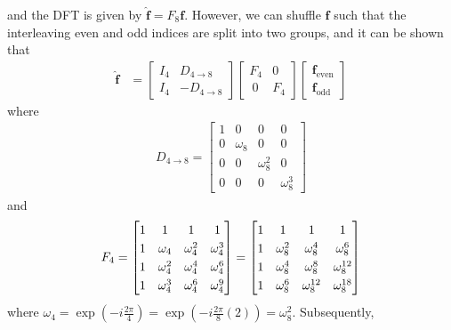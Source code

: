 and the DFT is given by $\hat{\textbf{f}} = F_8 \textbf{f}$. However, we can shuffle $\textbf{f}$ such that the interleaving even and odd indices are split into two groups, and it can be shown that
\begin{align*}
\hat{\textbf{f}} &= 
\begin{bmatrix}
I_4 & D_{4 \to 8} \\
I_4 & -D_{4 \to 8}
\end{bmatrix}
\begin{bmatrix}
F_4 & 0 \\\
0 & F_4
\end{bmatrix}
\begin{bmatrix}
\textbf{f}_{\text{even}} \\
\textbf{f}_{\text{odd}}
\end{bmatrix}
\end{align*}
where
\begin{align*}
D_{4 \to 8} = 
\begin{bmatrix}
1 & 0 & 0 & 0 \\
0 & \omega_8 & 0 & 0 \\
0 & 0 & \omega_8^2 & 0 \\
0 & 0 & 0 & \omega_8^3
\end{bmatrix}
\end{align*}
and 
\begin{align*}
\renewcommand\arraystretch{1.25}
F_4 = 
\begin{bmatrix}
1 & 1 & 1 & 1 \\
1 & \omega_4 & \omega_4^2 & \omega_4^3 \\
1 & \omega_4^2 & \omega_4^4 & \omega_4^6 \\
1 & \omega_4^3 & \omega_4^6 & \omega_4^9 \\
\end{bmatrix}
=
\begin{bmatrix}
1 & 1 & 1 & 1 \\
1 & \omega_8^2 & \omega_8^4 & \omega_8^6 \\
1 & \omega_8^4 & \omega_8^8 & \omega_8^{12} \\
1 & \omega_8^6 & \omega_8^{12} & \omega_8^{18} \\
\end{bmatrix}
\end{align*}
where $\omega_4 = \exp(-i\frac{2\pi}{4}) = \exp(-i\frac{2\pi}{8}(2)) = \omega_8^2$. Subsequently,

